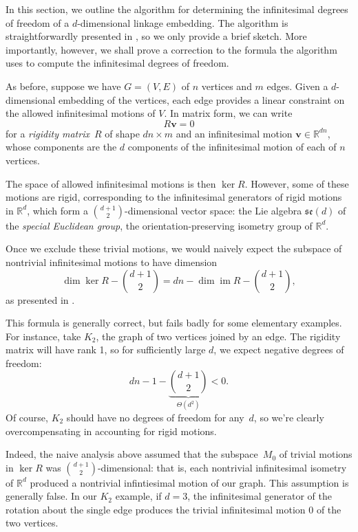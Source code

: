 \documentclass[aps,prd,final,twocolumn,letterpaper,nofootinbib]{revtex4-1}
\newcommand\RR{\mathbb{R}}
\DeclareMathOperator\im{im}
\newcommand{\mb}{\mathbf}
\begin{document}
In this section,
we outline the algorithm for determining the infinitesimal degrees of freedom
of a $d$-dimensional linkage embedding.
The algorithm is straightforwardly presented in \cite[\S4.4.2]{gfalop},
so we only provide a brief sketch.
More importantly, however,
we shall prove a correction to the formula the algorithm uses
to compute the infinitesimal degrees of freedom.

As before, suppose we have $G = (V, E)$ of $n$ vertices and $m$ edges.
Given a $d$-dimensional embedding of the vertices,
each edge provides a linear constraint
on the allowed infinitesimal motions of $V$.
In matrix form, we can write
\begin{equation}
    R\mb v = 0
\end{equation}
for a \emph{rigidity matrix}~$R$ of shape $dn \times m$
and an infinitesimal motion $\mb v \in \RR^{dn}$,
whose components are the $d$ components
of the infinitesimal motion of each of $n$ vertices.

The space of allowed infinitesimal motions is then $\ker R$.
However, some of these motions are rigid,
corresponding to the infinitesimal generators of rigid motions in $\RR^d$,
which form a $\binom{d+1}{2}$-dimensional vector space:
the Lie algebra $\mathfrak{se}(d)$ of the \emph{special Euclidean group},
the orientation-preserving isometry group of $\RR^d$.

Once we exclude these trivial motions,
we would naively expect the subspace of nontrivial infinitesimal motions
to have dimension
\begin{equation}\label{eq:wrong-infdof}
    \dim\ker R - \binom{d+1}{2} = dn - \dim\im R - \binom{d+1}{2},
\end{equation}
as presented in \cite{gfalop}.

This formula is generally correct,
but fails badly for some elementary examples.
For instance, take $K_2$, the graph of two vertices joined by an edge.
The rigidity matrix will have rank 1,
so for sufficiently large $d$,
we expect negative degrees of freedom:
\[
    dn - 1 - \underbrace{\binom{d+1}{2}}_{\Theta(d^2)} < 0.
\]
Of course, $K_2$ should have no degrees of freedom for any~$d$,
so we're clearly overcompensating in accounting for rigid motions.

Indeed, the naive analysis above
assumed that the subspace~$M_0$ of trivial motions in $\ker R$
was $\binom{d+1}{2}$-dimensional:
that is, each nontrivial infinitesimal isometry of $\RR^d$
produced a nontrivial infintiesimal motion of our graph.
This assumption is generally false.
In our $K_2$ example,
if $d=3$, 
the infinitesimal generator
of the rotation about the single edge
produces the trivial infinitesimal motion 0
of the two vertices.
\end{document}
